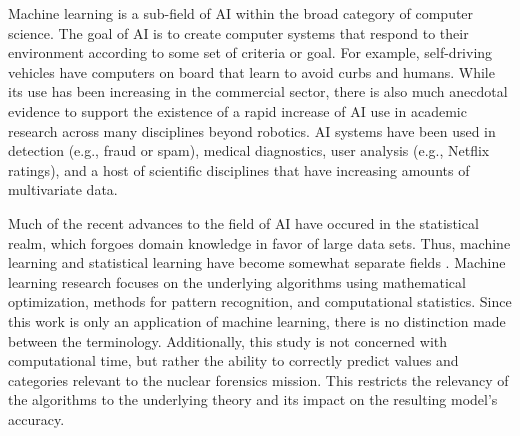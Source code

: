 Machine learning is a sub-field of \gls{AI} within the broad category of
computer science. The goal of \gls{AI} is to create computer systems that
respond to their environment according to some set of criteria or goal. For
example, self-driving vehicles have computers on board that learn to avoid
curbs and humans. While its use has been increasing in the commercial sector,
there is also much anecdotal evidence to support the existence of a rapid
increase of \gls{AI} use in academic research across many disciplines beyond
robotics. \gls{AI} systems have been used in detection (e.g., fraud or spam),
medical diagnostics, user analysis (e.g., Netflix ratings), and a host of
scientific disciplines that have increasing amounts of multivariate data.

Much of the recent advances to the field of \gls{AI} have occured in the
statistical realm, which forgoes domain knowledge in favor of large data sets.
Thus, machine learning and statistical learning have become somewhat separate
fields \cite{changingml}. Machine learning research focuses on the underlying
algorithms using mathematical optimization, methods for pattern recognition,
and computational statistics.  Since this work is only an application of
machine learning, there is no distinction made between the terminology.
Additionally, this study is not concerned with computational time, but rather
the ability to correctly predict values and categories relevant to the nuclear
forensics mission. This restricts the relevancy of the algorithms to the
underlying theory and its impact on the resulting model's accuracy. 

